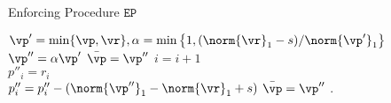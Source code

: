\begin{algorithm}[H]
            \caption{Enforcing Procedure $\mathtt{EP}$}
            \label{alg:EP}
            \begin{algorithmic}[1]
                \STATE \( \vp' = \min\{\vp, \vr\}, \alpha = \min\left\{ 1, (\norm{\vr}_1 - s) / \norm{\vp'}_1 \right\} \)
                \STATE \( \vp'' = \alpha \vp' \)
                    \STATE \(\bar{\vp} = \vp''\)
                \ELSE %
                        \STATE $i = i + 1$ \\
                        \STATE \( p''_i = r_i \)
                    \ENDWHILE \\
                    \STATE \( p''_i = p''_i - (\norm{\vp''}_1 - \norm{\vr}_1 +s)\) %
                    \STATE $\bar{\vp} = \vp''$
                \ENDIF 
                \ENSURE{$\bar{\vp}$}.
            \end{algorithmic}
\end{algorithm}

